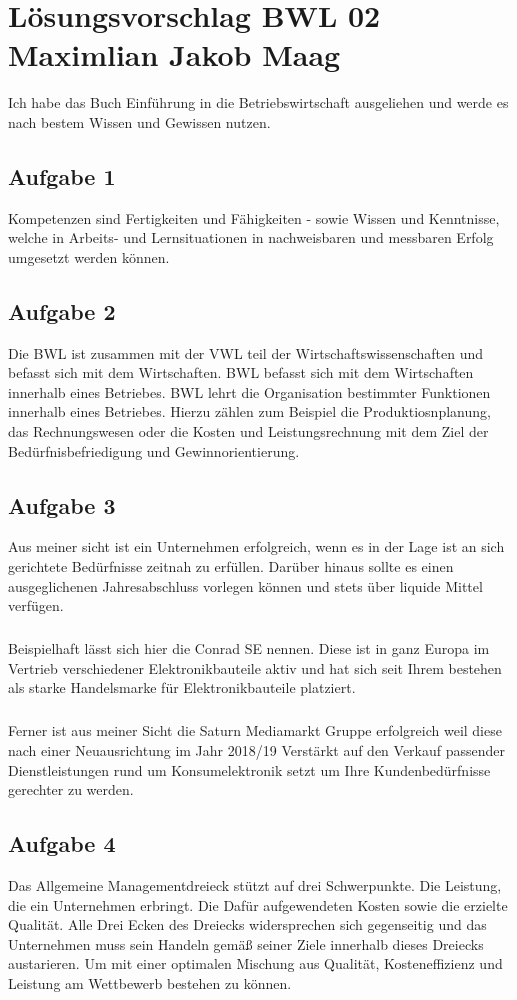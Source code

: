\documentclass{article}
\begin{document}
	\section*{Lösungsvorschlag BWL 02 Maximlian Jakob Maag}
	
	Ich habe das Buch Einführung in die Betriebswirtschaft ausgeliehen und werde es nach bestem Wissen und Gewissen nutzen.
	
	\subsection*{Aufgabe 1}
	
	Kompetenzen sind Fertigkeiten und Fähigkeiten - sowie Wissen und Kenntnisse, welche in Arbeits- und Lernsituationen in nachweisbaren und messbaren Erfolg umgesetzt werden können.
	
	\subsection*{Aufgabe 2}
	Die BWL ist zusammen mit der VWL teil der Wirtschaftswissenschaften und befasst sich mit dem Wirtschaften.  BWL befasst sich mit dem Wirtschaften innerhalb eines Betriebes. BWL lehrt die Organisation bestimmter Funktionen innerhalb eines Betriebes. Hierzu zählen zum Beispiel die Produktiosnplanung, das Rechnungswesen oder die Kosten und Leistungsrechnung mit dem Ziel der Bedürfnisbefriedigung und Gewinnorientierung.
	
	\subsection*{Aufgabe 3}
	Aus meiner sicht ist ein Unternehmen erfolgreich, wenn es in der Lage ist an sich gerichtete Bedürfnisse zeitnah zu erfüllen. Darüber hinaus sollte es einen ausgeglichenen Jahresabschluss vorlegen können und stets über liquide Mittel verfügen.
	\subparagraph*{}
	Beispielhaft lässt sich hier die Conrad SE nennen. Diese ist in ganz Europa im Vertrieb verschiedener Elektronikbauteile aktiv und hat sich seit Ihrem bestehen als starke Handelsmarke für Elektronikbauteile platziert.
	\subparagraph*{}
	Ferner ist aus meiner Sicht die Saturn Mediamarkt Gruppe erfolgreich weil diese nach einer Neuausrichtung im Jahr 2018/19 Verstärkt auf den Verkauf passender Dienstleistungen rund um Konsumelektronik setzt um Ihre Kundenbedürfnisse gerechter zu werden. 
	
	\subsection*{Aufgabe 4}
	Das Allgemeine Managementdreieck stützt auf drei Schwerpunkte. Die Leistung, die ein Unternehmen erbringt. Die Dafür aufgewendeten Kosten sowie die erzielte Qualität. Alle Drei Ecken des Dreiecks widersprechen sich gegenseitig und das Unternehmen muss sein Handeln gemäß seiner Ziele innerhalb dieses Dreiecks austarieren. Um mit einer optimalen Mischung aus Qualität, Kosteneffizienz und Leistung am Wettbewerb bestehen zu können.
	
\end{document}
